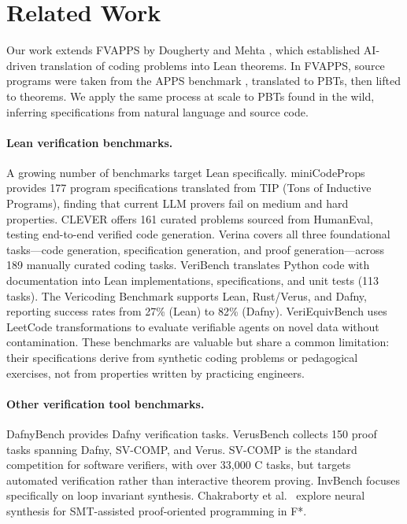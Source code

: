 \section{Related Work}
Our work extends FVAPPS by Dougherty and Mehta \cite{dougherty2025proving}, which established AI-driven translation of coding problems into Lean theorems. In FVAPPS, source programs were taken from the APPS benchmark \cite{hendrycks2021apps}, translated to PBTs, then lifted to theorems. We apply the same process at scale to PBTs found in the wild, inferring specifications from natural language and source code. 

\paragraph{Lean verification benchmarks.}
A growing number of benchmarks target Lean specifically. miniCodeProps \cite{brandfonbrener2024minicodeprops} provides 177 program specifications translated from TIP (Tons of Inductive Programs), finding that current LLM provers fail on medium and hard properties. CLEVER \cite{thakur2025clever} offers 161 curated problems sourced from HumanEval, testing end-to-end verified code generation. Verina \cite{wu2025verina} covers all three foundational tasks---code generation, specification generation, and proof generation---across 189 manually curated coding tasks. VeriBench \cite{stechly2025veribench} translates Python code with documentation into Lean implementations, specifications, and unit tests (113 tasks). The Vericoding Benchmark \cite{bursuc2025benchmark} supports Lean, Rust/Verus, and Dafny, reporting success rates from 27\% (Lean) to 82\% (Dafny). VeriEquivBench \cite{ma2025veriequivbench} uses LeetCode transformations to evaluate verifiable agents on novel data without contamination. These benchmarks are valuable but share a common limitation: their specifications derive from synthetic coding problems or pedagogical exercises, not from properties written by practicing engineers.

\paragraph{Other verification tool benchmarks.}
DafnyBench \cite{loughridge2024dafnybench} provides Dafny verification tasks. VerusBench \cite{chen2024verusbench} collects 150 proof tasks spanning Dafny, SV-COMP, and Verus. SV-COMP \cite{beyer2025svcomp} is the standard competition for software verifiers, with over 33{,}000 C tasks, but targets automated verification rather than interactive theorem proving. InvBench \cite{wu2025invbench} focuses specifically on loop invariant synthesis. Chakraborty et al.\ \cite{chakraborty2024neural} explore neural synthesis for SMT-assisted proof-oriented programming in F*.

